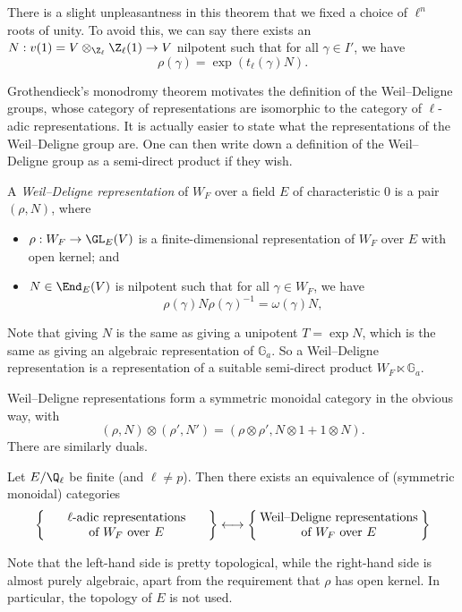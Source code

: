 \documentclass[a4paper]{article}
\renewcommand\G{\mathbb{G}}
\begin{document}
There is a slight unpleasantness in this theorem that we fixed a choice of $\ell^n$ roots of unity. To avoid this, we can say there exists an $N: v(1) = V \otimes_{\Z_\ell} \Z_{\ell}(1) \to V$ nilpotent such that for all $\gamma \in I'$, we have
\[
  \rho(\gamma) = \exp (t_\ell(\gamma) N).
\]

Grothendieck's monodromy theorem motivates the definition of the Weil--Deligne groups, whose category of representations are isomorphic to the category of $\ell$-adic representations. It is actually easier to state what the representations of the Weil--Deligne group are. One can then write down a definition of the Weil--Deligne group as a semi-direct product if they wish.

\begin{defi}
  A \emph{Weil--Deligne representation} of $W_F$ over a field $E$ of characteristic $0$ is a pair $(\rho, N)$, where
  \begin{itemize}
    \item $\rho: W_F \to \GL_E(V)$ is a finite-dimensional representation of $W_F$ over $E$ with open kernel; and
    \item $N \in \End_E(V)$ is nilpotent such that for all $\gamma \in W_F$, we have
      \[
        \rho(\gamma) N \rho(\gamma)^{-1} = \omega(\gamma) N,
      \]
  \end{itemize}
\end{defi}
Note that giving $N$ is the same as giving a unipotent $T = \exp N$, which is the same as giving an algebraic representation of $\G_a$. So a Weil--Deligne representation is a representation of a suitable semi-direct product $W_F \ltimes \G_a$.

Weil--Deligne representations form a symmetric monoidal category in the obvious way, with
\[
  (\rho, N ) \otimes (\rho', N') = (\rho \otimes \rho', N \otimes 1 + 1 \otimes N).
\]
There are similarly duals.

\begin{thm}
  Let $E/\Q_\ell$ be finite (and $\ell \not= p$). Then there exists an equivalence of (symmetric monoidal) categories
  \[
    \left\{\parbox{4.6cm}{\centering $\ell$-adic representations\\ of $W_F$ over $E$}\right\} \longleftrightarrow \left\{\parbox{4.6cm}{\centering Weil--Deligne representations of $W_F$ over $E$}\right\}
  \]
\end{thm}
Note that the left-hand side is pretty topological, while the right-hand side is almost purely algebraic, apart from the requirement that $\rho$ has open kernel. In particular, the topology of $E$ is not used.
\end{document}
